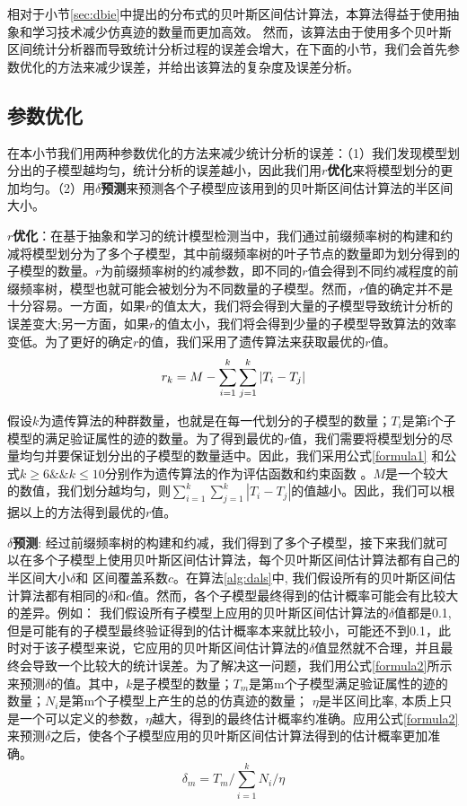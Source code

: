 相对于小节\ref{sec:dbie}中提出的分布式的贝叶斯区间估计算法，本算法得益于使用抽象和学习技术减少仿真迹的数量而更加高效。 然而，该算法由于使用多个贝叶斯区间统计分析器而导致统计分析过程的误差会增大，在下面的小节，我们会首先参数优化的方法来减少误差，并给出该算法的复杂度及误差分析。

\subsection{参数优化}
\label{sec:opt}
在本小节我们用两种参数优化的方法来减少统计分析的误差：（1）我们发现模型划分出的子模型越均匀，统计分析的误差越小，因此我们用\textbf{$r$优化}来将模型划分的更加均匀。（2）用\textbf{$\delta$预测}来预测各个子模型应该用到的贝叶斯区间估计算法的半区间大小。

\textbf{$r$优化}：在基于抽象和学习的统计模型检测当中，我们通过前缀频率树的构建和约减将模型划分为了多个子模型，其中前缀频率树的叶子节点的数量即为划分得到的子模型的数量。$r$为前缀频率树的约减参数，即不同的$r$值会得到不同约减程度的前缀频率树，模型也就可能会被划分为不同数量的子模型。然而，$r$值的确定并不是十分容易。一方面，如果$r$的值太大，我们将会得到大量的子模型导致统计分析的误差变大;另一方面，如果$r$的值太小，我们将会得到少量的子模型导致算法的效率变低。为了更好的确定$r$的值，我们采用了遗传算法\cite{DBLP:books/daglib/0019871}来获取最优的$r$值。 
\begin{equation}
\centering
\label{formula1}
r_k = M - \sum\limits_{i=1}^k \sum\limits_{j=1}^k |T_i - T_j| 
\end{equation}

假设$k$为遗传算法的种群数量，也就是在每一代划分的子模型的数量；$T_i$是第i个子模型的满足验证属性的迹的数量。为了得到最优的$r$值，我们需要将模型划分的尽量均匀并要保证划分出的子模型的数量适中。因此，我们采用公式\ref{formula1} 和公式$k \geq 6 \&\& k \leq 10$分别作为遗传算法的作为评估函数和约束函数 。$M$是一个较大的数值，我们划分越均匀，则$\sum\limits_{i=1}^k \sum\limits_{j=1}^k |T_i - T_j|$的值越小。因此，我们可以根据以上的方法得到最优的$r$值。

\textbf{$\delta$预测}:
经过前缀频率树的构建和约减，我们得到了多个子模型，接下来我们就可以在多个子模型上使用贝叶斯区间估计算法，每个贝叶斯区间估计算法都有自己的半区间大小$\delta$和 区间覆盖系数$c$。在算法\ref{alg:dals}中, 我们假设所有的贝叶斯区间估计算法都有相同的$\delta$和$c$值。然而，各个子模型最终得到的估计概率可能会有比较大的差异。例如： 我们假设所有子模型上应用的贝叶斯区间估计算法的$\delta$值都是0.1, 但是可能有的子模型最终验证得到的估计概率本来就比较小，可能还不到0.1，此时对于该子模型来说，它应用的贝叶斯区间估计算法的$\delta$值显然就不合理，并且最终会导致一个比较大的统计误差。为了解决这一问题，我们用公式\ref{formula2}所示来预测$\delta$的值。其中，$k$是子模型的数量；$T_m$是第m个子模型满足验证属性的迹的数量；$N_i$是第m个子模型上产生的总的仿真迹的数量； $\eta$是半区间比率, 本质上只是一个可以定义的参数，$\eta$越大，得到的最终估计概率约准确。应用公式\ref{formula2}来预测$\delta$之后，使各个子模型应用的贝叶斯区间估计算法得到的估计概率更加准确。
\begin{equation}
\label{formula2}
\delta_m = T_m / \sum\limits_{i=1}^k N_i / \eta
\end{equation}
